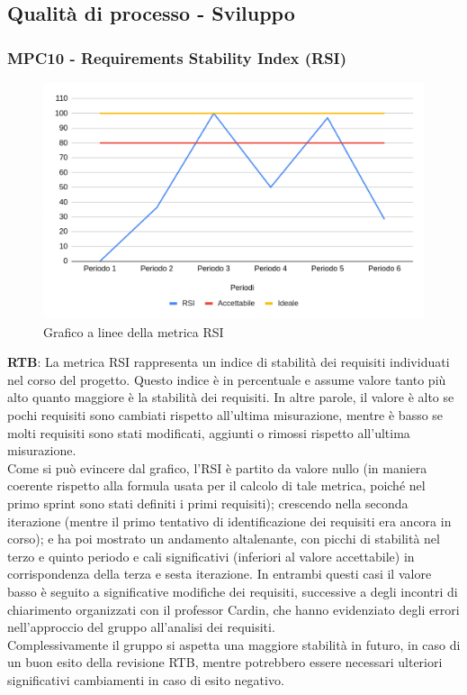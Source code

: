 \documentclass[10pt]{article}
\begin{document}
\begin{justify}
\subsection{Qualità di processo - Sviluppo}
\subsubsection{MPC10 - Requirements Stability Index (RSI)}  

\begin{figure}[H]
  \centering
  \includegraphics[width=0.9\linewidth]{RSI.png}
  \caption{Grafico a linee della metrica RSI}
  \label{fig:RSIchart}
\end{figure}

\textbf{RTB}: La metrica RSI rappresenta un indice di stabilità dei requisiti individuati nel corso del progetto. Questo indice è in percentuale e assume valore tanto più alto 
quanto maggiore è la stabilità dei requisiti. In altre parole, il valore è alto se pochi requisiti sono cambiati rispetto all'ultima misurazione, mentre è basso se molti requisiti sono
stati modificati, aggiunti o rimossi rispetto all'ultima misurazione.\\
Come si può evincere dal grafico, l'RSI è partito da valore nullo (in maniera coerente rispetto alla formula usata per il calcolo di tale metrica, poiché nel primo sprint 
sono stati definiti i primi requisiti); crescendo nella seconda iterazione (mentre il primo tentativo di identificazione dei requisiti era ancora in corso); e ha poi mostrato 
un andamento altalenante, con picchi di stabilità nel terzo e quinto periodo e cali significativi (inferiori al valore accettabile) in corrispondenza della terza e sesta iterazione. In entrambi questi 
casi il valore basso è seguito a significative modifiche dei requisiti, successive a degli incontri di chiarimento organizzati con il professor Cardin, che  hanno 
evidenziato degli errori nell'approccio del gruppo all'analisi dei requisiti.\\
Complessivamente il gruppo si aspetta una maggiore stabilità in futuro, in caso di un buon esito della revisione RTB, mentre potrebbero essere necessari ulteriori
significativi cambiamenti in caso di esito negativo.\\



\end{justify}
\end{document}
